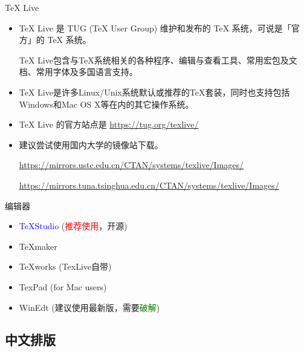 \documentclass[13pt]{ctexbeamer}
\newcommand{\red}[1]{\textcolor{red}{#1}}
\newcommand{\blue}[1]{\textcolor{blue}{#1}}
\newcommand{\green}[1]{\textcolor{green}{#1}}
\begin{document}
\begin{frame}{TeX Live}
	\begin{itemize}
		\item TeX Live 是 TUG (TeX User Group) 维护和发布的 TeX 系统，可说是「官方」的 TeX 系统。

	TeX Live包含与TeX系统相关的各种程序、编辑与查看工具、常用宏包及文档、常用字体及多国语言支持。
	\item
	TeX Live是许多Linux/Unix系统默认或推荐的TeX套装，同时也支持包括Windows和Mac OS X等在内的其它操作系统。
\end{itemize}
\begin{itemize}

	\item TeX Live 的官方站点是 \href{https://tug.org/texlive/}{https://tug.org/texlive/}
	\item 建议尝试使用国内大学的镜像站下载。

	\href{https://mirrors.ustc.edu.cn/CTAN/systems/texlive/Images/} {https://mirrors.ustc.edu.cn/CTAN/systems/texlive/Images/}


	\href{https://mirrors.tuna.tsinghua.edu.cn/CTAN/systems/texlive/Images/}{https://mirrors.tuna.tsinghua.edu.cn/CTAN/systems/texlive/Images/}

\end{itemize}
\end{frame}


\begin{frame}{编辑器}
\begin{itemize}
\item  \blue{TeXStudio} (\red{推荐使用}，开源)
\item TeXmaker
\item TeXworks (TexLive自带)
\item TexPad (for Mac users)
\item WinEdt (建议使用最新版，需要\green{破解})
\end{itemize}
\end{frame}






\subsection{中文排版}

%
%
%
\end{document}
